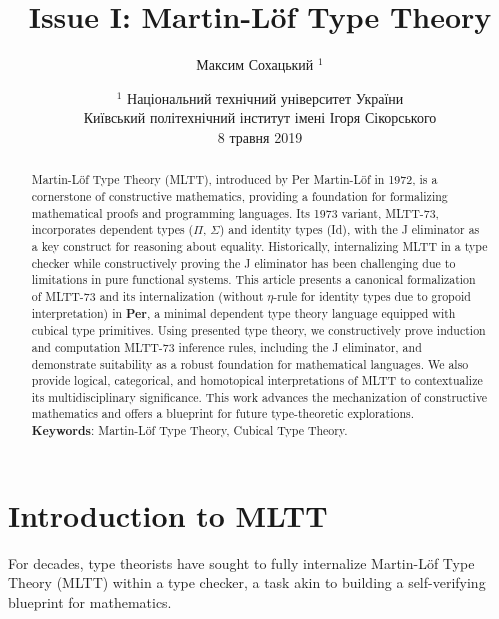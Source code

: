 \documentclass{article}
\theoremstyle{definition}
\newif\ifincludeTOC
\begin{document}
\title{Issue I: Martin-Löf Type Theory}
\author{Максим Сохацький $^1$}
\date{ $^1$ Національний технічний університет України \\
       \small Київський політехнічний інститут імені Ігоря Сікорського \\
       8 травня 2019 }

\maketitle

\begin{abstract}
Martin-Löf Type Theory (MLTT), introduced by Per Martin-Löf in 1972,
is a cornerstone of constructive mathematics, providing a foundation
for formalizing mathematical proofs and programming languages.
Its 1973 variant, MLTT-73, incorporates dependent types ($\Pi$, $\Sigma$)
and identity types (Id), with the J eliminator as a key construct for reasoning about equality.
Historically, internalizing MLTT in a type checker while constructively
proving the J eliminator has been challenging due to limitations in pure
functional systems. This article presents a canonical formalization of
MLTT-73 and its internalization (without $\eta$-rule for identity types due to gropoid interpretation)
in \textbf{Per}, a minimal dependent type theory language equipped with cubical type primitives.
Using presented type theory, we constructively prove induction and computation MLTT-73 inference rules,
including the J eliminator, and demonstrate suitability as a robust foundation for mathematical languages.
We also provide logical, categorical, and homotopical interpretations of MLTT
to contextualize its multidisciplinary significance.
This work advances the mechanization of constructive mathematics and offers
a blueprint for future type-theoretic explorations. \\
\indent \textbf{Keywords}: Martin-Löf Type Theory, Cubical Type Theory.
\end{abstract}

\ifincludeTOC
  \tableofcontents
\fi

\newpage
\section*{Introduction to MLTT}

For decades, type theorists have sought to fully internalize
Martin-Löf Type Theory (MLTT) within a type checker, a task
akin to building a self-verifying blueprint for mathematics.
\end{document}
